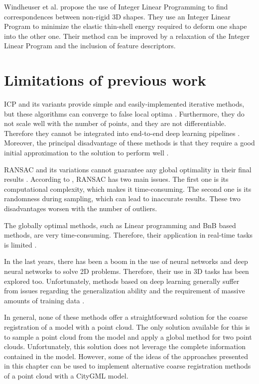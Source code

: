    Windheuser et al. \cite{Windheuser_2011_largescale} propose the use of Integer Linear Programming to find correspondences between non-rigid 3D shapes.
    They use an Integer Linear Program to minimize the elastic thin-shell energy required to deform one shape into the other one.
    Their method can be improved by a relaxation of the Integer Linear Program and the inclusion of feature descriptors.

    \section{Limitations of previous work} 

    ICP and its variants provide simple and easily-implemented iterative methods, but these algorithms can converge to false local optima \cite{Wang_2019_deepclosest}.
    Furthermore, they do not scale well with the number of points, and they are not differentiable. 
    Therefore they cannot be integrated into end-to-end deep learning pipelines \cite{Sarode_2019_oneframework}. 
    Moreover, the principal disadvantage of these methods is that they require a good initial approximation to the solution to perform well \cite{Sakakubara_2007_automatic}.
    
    RANSAC and its variations cannot guarantee any global optimality in their final results \cite{Bazin_2013_abranchandbound}.
    According to \cite{Quan_2020_com}, RANSAC has two main issues. 
    The first one is its computational complexity, which makes it time-consuming.
    The second one is its randomness during sampling, which can lead to inaccurate results.
    These two disadvantages worsen with the number of outliers.

    The globally optimal methods, such as Linear programming and BnB based methods, are very time-consuming. 
    Therefore, their application in real-time tasks is limited \cite{Sarode_2019_oneframework}.

    In the last years, there has been a boom in the use of neural networks and deep neural networks to solve 2D problems.
    Therefore, their use in 3D tasks has been explored too.
    Unfortunately, methods based on deep learning generally suffer from issues regarding the generalization ability and the requirement of massive amounts of training data \cite{Quan_2020_com}.

    In general, none of these methods offer a straightforward solution for the coarse registration of a model with a point cloud.
    The only solution available for this is to sample a point cloud from the model and apply a global method for two point clouds.
    Unfortunately, this solution does not leverage the complete information contained in the model.
    However, some of the ideas of the approaches presented in this chapter can be used to implement alternative coarse registration methods of a point cloud with a CityGML model.


